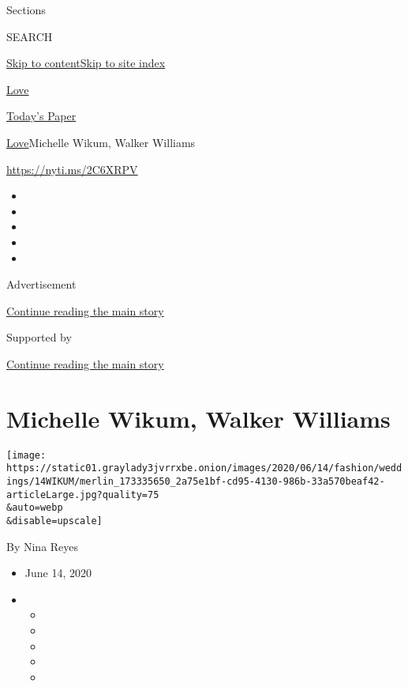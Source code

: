Sections

SEARCH

\protect\hyperlink{site-content}{Skip to
content}\protect\hyperlink{site-index}{Skip to site index}

\href{https://www.nytimes3xbfgragh.onion/section/fashion/weddings}{Love}

\href{https://myaccount.nytimes3xbfgragh.onion/auth/login?response_type=cookie\&client_id=vi}{}

\href{https://www.nytimes3xbfgragh.onion/section/todayspaper}{Today's
Paper}

\href{/section/fashion/weddings}{Love}\textbar{}Michelle Wikum, Walker
Williams

\url{https://nyti.ms/2C6XRPV}

\begin{itemize}
\item
\item
\item
\item
\item
\end{itemize}

Advertisement

\protect\hyperlink{after-top}{Continue reading the main story}

Supported by

\protect\hyperlink{after-sponsor}{Continue reading the main story}

\hypertarget{michelle-wikum-walker-williams}{%
\section{Michelle Wikum, Walker
Williams}\label{michelle-wikum-walker-williams}}

\texttt{[image: https://static01.graylady3jvrrxbe.onion/images/2020/06/14/fashion/weddings/14WIKUM/merlin\_173335650\_2a75e1bf-cd95-4130-986b-33a570beaf42-articleLarge.jpg?quality=75\\\&auto=webp\\\&disable=upscale]}

By Nina Reyes

\begin{itemize}
\item
  June 14, 2020
\item
  \begin{itemize}
  \item
  \item
  \item
  \item
  \item
  \end{itemize}
\end{itemize}


